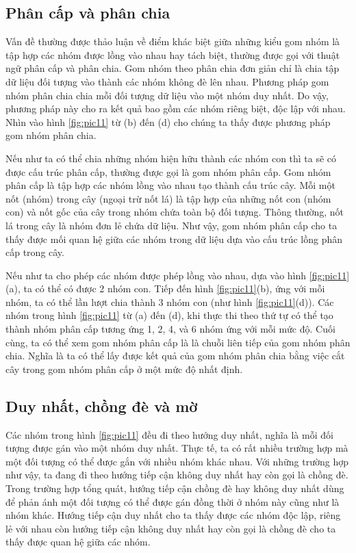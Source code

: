 \subsection{Phân cấp và phân chia}
Vấn đề thường được thảo luận về điểm khác biệt giữa những kiểu gom nhóm là tập hợp các nhóm được lồng vào nhau hay tách biệt, thường được gọi với thuật ngữ phân cấp và phân chia.
Gom nhóm theo phân chia đơn giản chỉ là chia tập dữ liệu đối tượng vào thành các nhóm không đè lên nhau.
Phương pháp gom nhóm phân chia chia mỗi đối tượng dữ liệu vào một nhóm duy nhất.
Do vậy, phương pháp này cho ra kết quả bao gồm các nhóm riêng biệt, độc lập với nhau.
Nhìn vào hình \ref{fig:pic11} từ (b) đến (d) cho chúng ta thấy được phương pháp gom nhóm phân chia.

Nếu như ta có thể chia những nhóm hiện hữu thành các nhóm con thì ta sẽ có được cấu trúc phân cấp, thường được gọi là gom nhóm phân cấp.
Gom nhóm phân cấp là tập hợp các nhóm lồng vào nhau tạo thành cấu trúc cây.
Mỗi một nốt (nhóm) trong cây (ngoại trừ nốt lá) là tập hợp của những nốt con (nhóm con) và nốt gốc của cây trong nhóm chứa toàn bộ đối tượng.
Thông thường, nốt lá trong cây là nhóm đơn lẻ chứa dữ liệu.
Như vậy, gom nhóm phân cấp cho ta thấy được mối quan hệ giữa các nhóm trong dữ liệu dựa vào cấu trúc lồng phân cấp trong cây.

Nếu như ta cho phép các nhóm được phép lồng vào nhau, dựa vào hình \ref{fig:pic11}(a), ta có thể có được 2 nhóm con.
Tiếp đến hình \ref{fig:pic11}(b), ứng với mỗi nhóm, ta có thể lần lượt chia thành 3 nhóm con (như hình \ref{fig:pic11}(d)).
Các nhóm trong hình \ref{fig:pic11} từ (a) đến (d), khi thực thi theo thứ tự có thể tạo thành nhóm phân cấp tương ứng 1, 2, 4, và 6 nhóm ứng với mỗi mức độ.
Cuối cùng, ta có thể xem gom nhóm phân cấp là là chuỗi liên tiếp của gom nhóm phân chia.
Nghĩa là ta có thể lấy được kết quả của gom nhóm phân chia bằng việc cắt cây trong gom nhóm phân cấp ở một mức độ nhất định.

\subsection{Duy nhất, chồng đè và mờ}
Các nhóm trong hình \ref{fig:pic11} đều đi theo hướng duy nhất, nghĩa là mỗi đối tượng được gán vào một nhóm duy nhất.
Thực tế, ta có rất nhiều trường hợp mà một đối tượng có thể được gắn với nhiều nhóm khác nhau.
Với những trường hợp như vậy, ta đang đi theo hướng tiếp cận không duy nhất hay còn gọi là chồng đè.
Trong trường hợp tổng quát, hướng tiếp cận chồng đè hay không duy nhất dùng để phản ánh một đối tượng có thể được gán đồng thời ở nhóm này cũng như là nhóm khác.
Hướng tiếp cận duy nhất cho ta thấy được các nhóm độc lập, riêng lẻ với nhau còn hướng tiếp cận không duy nhất hay còn gọi là chồng đè cho ta thấy được quan hệ giữa các nhóm.

